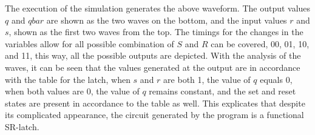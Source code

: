 \documentclass[12pt]{article}
\begin{document}
    \par The execution of the simulation generates the above waveform. The
    output values $q$ and $qbar$ are shown as the two waves on the bottom, and
    the input values $r$ and $s$, shown as the first two waves from the top.
    The timings for the changes in the variables allow for all possible
    combination of $S$ and $R$ can be covered, 00, 01, 10, and 11, this way, all
    the possible outputs are depicted. With the analysis of the waves, it can be
    seen that the values generated at the output are in accordance with the
    table for the latch, when $s$ and $r$ are both 1, the value of $q$ equals 0,
    when both values are 0, the value of $q$ remains constant, and the set and
    reset states are present in accordance to the table as well. This explicates
    that despite its complicated appearance, the circuit generated by the
    program is a functional SR-latch.
    \newpage
\end{document}
